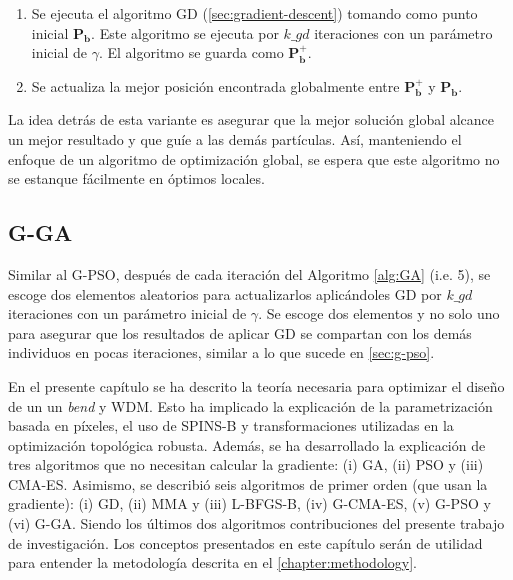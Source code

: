 \begin{enumerate}
  \item Se ejecuta el algoritmo GD (\autoref{sec:gradient-descent}) tomando como punto inicial
       $\boldsymbol{P_{b}}$. Este algoritmo se ejecuta por $k\_gd$ iteraciones con un 
       parámetro inicial de $\gamma$. El algoritmo se guarda como $\boldsymbol{P_{b}^{+}}$. 
  \item Se actualiza la mejor posición encontrada globalmente entre $\boldsymbol{P_{b}^{+}}$ y 
       $\boldsymbol{P_{b}}$.
\end{enumerate}

La idea detrás de esta variante es asegurar que la mejor solución global alcance un mejor resultado
y que guíe a las demás partículas.
Así, manteniendo el enfoque de un algoritmo de optimización global, se espera que este algoritmo
no se estanque fácilmente en óptimos locales.


\subsection{G-GA}\label{sec:g-ga}

Similar al G-PSO, después de cada iteración del Algoritmo \ref{alg:GA} (i.e. 5), se escoge dos
elementos aleatorios para actualizarlos aplicándoles GD por $k\_gd$ iteraciones con un parámetro inicial
de $\gamma$.
Se escoge dos elementos y no solo uno para asegurar que los resultados de aplicar GD
se compartan con los demás individuos en pocas iteraciones, similar a lo que sucede en \autoref{sec:g-pso}.


En el presente capítulo se ha descrito la teoría necesaria para optimizar el diseño de un
un \emph{bend} y WDM.
Esto ha implicado la explicación de la parametrización basada en píxeles,
el uso de SPINS-B y transformaciones utilizadas en la optimización topológica robusta.
Además, se ha desarrollado la explicación de tres algoritmos que no necesitan calcular la gradiente:
(i) GA, (ii) PSO y (iii) CMA-ES. Asimismo, se describió seis algoritmos de primer orden 
(que usan la gradiente): (i) GD, (ii) MMA y (iii) L-BFGS-B, (iv) G-CMA-ES, (v) G-PSO y (vi) G-GA.
Siendo los últimos dos algoritmos contribuciones del presente trabajo de investigación.
Los conceptos presentados en este capítulo serán de utilidad para entender la metodología descrita en el
\autoref{chapter:methodology}.
